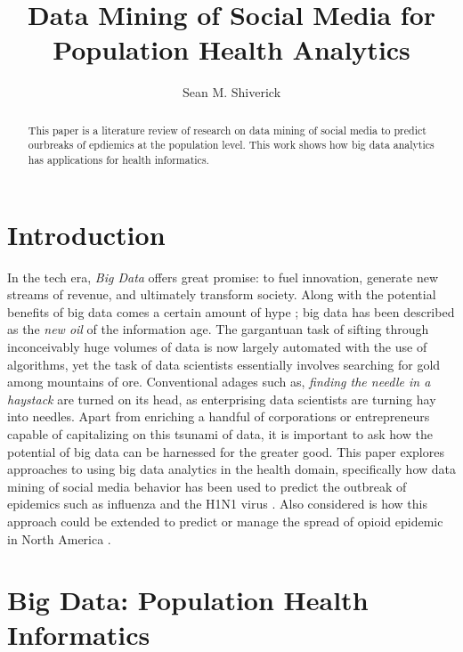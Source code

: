 \documentclass[sigconf]{acmart}
\begin{document}
\title{Data Mining of Social Media for Population Health Analytics}
\author{Sean M. Shiverick}


\begin{abstract}
This paper is a literature review of research on data mining of social media to predict ourbreaks of epdiemics at the population level. This work shows how big data analytics has applications for health informatics.
\end{abstract}



\maketitle

\section{Introduction}

In the tech era, \textit{Big Data} offers great promise: to fuel innovation, generate new streams of revenue, and ultimately transform society. Along with the potential benefits of big data comes a certain amount of hype \cite{gupta15}; big data has been described as the \textit{new oil} of the information age. The gargantuan task of sifting through inconceivably huge volumes of data is now largely automated with the use of algorithms, yet the task of data scientists essentially involves searching for gold among mountains of ore. Conventional adages such as, \textit{finding the needle in a haystack} are turned on its head, as enterprising data scientists are turning hay into needles. Apart from enriching a handful of corporations or entrepreneurs capable of capitalizing on this tsunami of data, it is important to ask how the potential of big data can be harnessed for the greater good. This paper explores approaches to using big data analytics in the health domain, specifically how data mining of social media behavior has been used to predict the outbreak of epidemics such as influenza and the H1N1 virus \cite{ginsburg09, signorini11, paul14}. Also considered is how this approach could be extended to predict or manage the spread of opioid epidemic in North America \cite{volkow14}.

\section{Big Data: Population Health Informatics}
\end{document}
